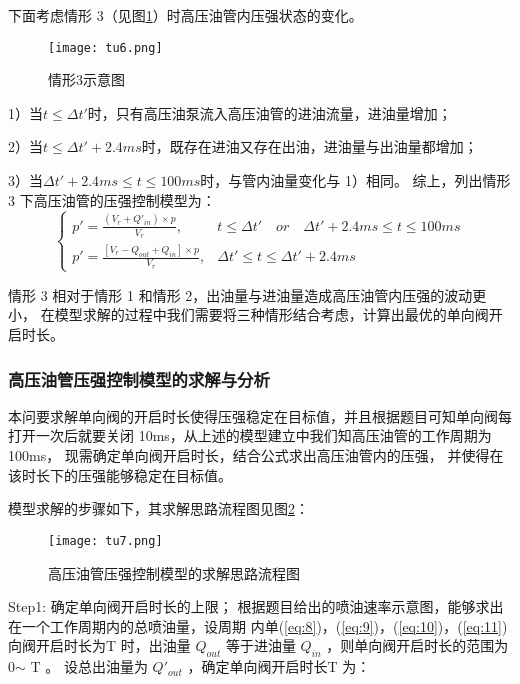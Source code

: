 \documentclass{cumcmthesis}
\begin{document}
下面考虑情形 3（见图\ref{fig:6}）时高压油管内压强状态的变化。
\begin{figure}[htb] \centering 
	
	\texttt{[image: tu6.png]} 
	
	\caption{情形3示意图 } \label{fig:6} \end{figure} 

1）当$t\le \Delta t'$时，只有高压油泵流入高压油管的进油流量，进油量增加； 

2）当$t\le \Delta t'+2.4ms$时，既存在进油又存在出油，进油量与出油量都增加； 

3）当$\Delta t'+ 2.4ms \leq t \le 100ms$时，与管内油量变化与 1）相同。 综上，列出情形 3 下高压油管的压强控制模型为：
\begin{equation}
\begin{cases}
p'=\frac{\left(V_{r}+Q'_{in}\right)\times p}{V_{r}},&t\le \Delta t' \quad or\quad  \Delta t'+2.4ms \leq t \le 100ms\\
p'=\frac{\left[V_{r}-Q_{out}+Q_{in}\right] \times p}{V_{r}},&\Delta t' \leq t \le \Delta t' +2.4ms
\end{cases}\label{eq:11}
\end{equation}

情形 3 相对于情形 1 和情形 2，出油量与进油量造成高压油管内压强的波动更小， 在模型求解的过程中我们需要将三种情形结合考虑，计算出最优的单向阀开启时长。

\subsubsection{高压油管压强控制模型的求解与分析}
本问要求解单向阀的开启时长使得压强稳定在目标值，并且根据题目可知单向阀每 打开一次后就要关闭 10ms，从上述的模型建立中我们知高压油管的工作周期为 100ms， 现需确定单向阀开启时长，结合公式求出高压油管内的压强， 并使得在该时长下的压强能够稳定在目标值。

 模型求解的步骤如下，其求解思路流程图见图\ref{fig:7}： 
 
 \begin{figure}[htb] \centering 
 	
 	\texttt{[image: tu7.png]} 
 	
 	\caption{高压油管压强控制模型的求解思路流程图} \label{fig:7} \end{figure} 
 
 Step1: 确定单向阀开启时长的上限； 根据题目给出的喷油速率示意图，能够求出在一个工作周期内的总喷油量，设周期 内单(\ref{eq:8})，(\ref{eq:9})，(\ref{eq:10})，(\ref{eq:11})向阀开启时长为T 时，出油量 $Q_{out}$ 等于进油量 $Q_{in}$ ，则单向阀开启时长的范围为0$\sim$ T 。
设总出油量为 $Q'_{out}$ ，确定单向阀开启时长T 为： 
\end{document}
